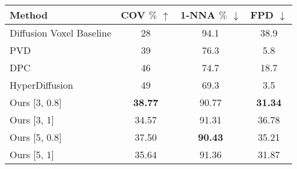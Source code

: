 \begin{tabular}{l c c c}
  \toprule
  Method                   & COV \(\%\) $\uparrow$ & 1-NNA \(\%\) $\downarrow$ & FPD $\downarrow$ \\
  \midrule
  Diffusion Voxel Baseline & 28                    & 94.1                      & 38.9             \\
  PVD                      & 39                    & 76.3                      & 5.8              \\
  DPC                      & 46                    & 74.7                      & 18.7             \\
  HyperDiffusion           & 49                    & 69.3                      & 3.5              \\

  \hline

  Ours [3, 0.8]            & \textbf{38.77}        & 90.77                     & \textbf{31.34}   \\
  Ours [3, 1]              & 34.57                 & 91.31                     & 36.78            \\

  Ours [5, 0.8]            & 37.50                 & \textbf{90.43}            & 35.21            \\
  Ours [5, 1]              & 35.64                 & 91.36                     & 31.87            \\
  \bottomrule
\end{tabular}
